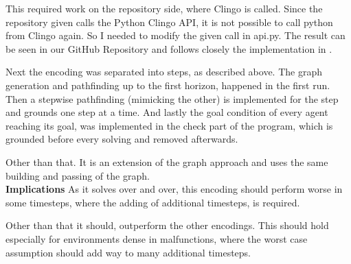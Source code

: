 This required work on the repository side, where Clingo is called. Since the repository given calls the Python Clingo API, it is not possible to call python from Clingo again. So I needed to modify the given call in api.py. The result can be seen in our GitHub Repository and follows closely the implementation in \cite{incr}.

Next the encoding was separated into steps, as described above. The graph generation and pathfinding up to the first horizon, happened in the first run. Then a stepwise pathfinding (mimicking the other) is implemented for the step and grounds one step at a time. And lastly the goal condition of every agent reaching its goal, was implemented in the check part of the program, which is grounded before every solving and removed afterwards.

Other than that. It is an extension of the graph approach and uses the same building and passing of the graph.\\

\noindent \textbf{Implications} As it solves over and over, this encoding should perform worse in some timesteps, where the adding of additional timesteps, is required.

Other than that it should, outperform the other encodings. This should hold especially for environments dense in malfunctions, where the worst case assumption should add way to many additional timesteps.
